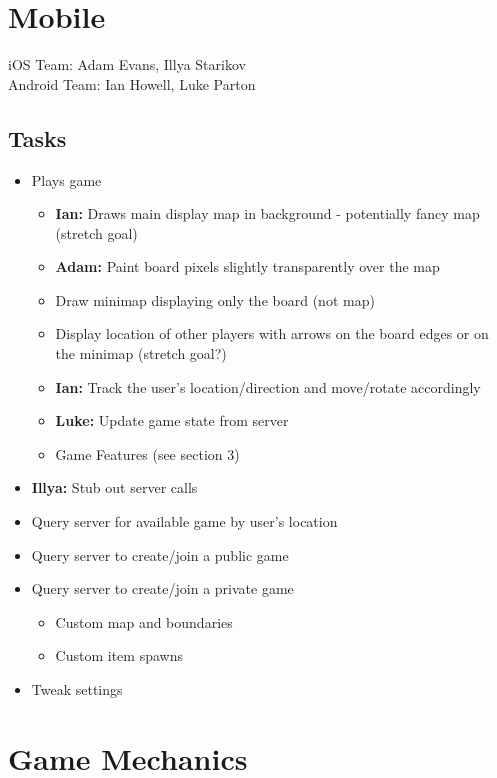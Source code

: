\documentclass{article}
\begin{document}
\newpage
\section{Mobile}
iOS Team: Adam Evans, Illya Starikov\\
Android Team: Ian Howell, Luke Parton
\subsection{Tasks}
\begin{itemize}
  \item Plays game
    \begin{itemize}
      \item \textbf{Ian:} Draws main display map in background - potentially fancy map (stretch goal)
      \item \textbf{Adam:} Paint board pixels slightly transparently over the map
      \item Draw minimap displaying only the board (not map)
      \item Display location of other players with arrows on the board edges or on the minimap (stretch goal?)
      \item \textbf{Ian:} Track the user's location/direction and move/rotate accordingly
      \item \textbf{Luke:} Update game state from server
      \item Game Features (see section 3)
    \end{itemize}
  \item \textbf{Illya:} Stub out server calls
  \item Query server for available game by user's location
  \item Query server to create/join a public game
  \item Query server to create/join a private game
    \begin{itemize}
      \item Custom map and boundaries
      \item Custom item spawns
    \end{itemize}
  \item Tweak settings
\end{itemize}

\newpage
\section{Game Mechanics}

\end{document}
